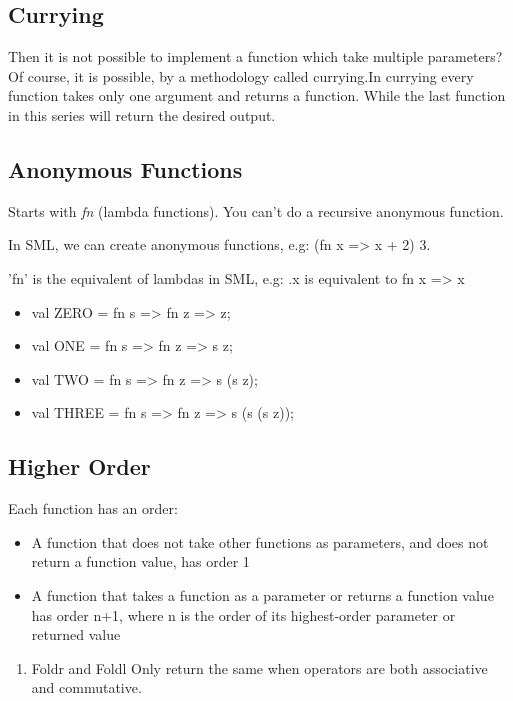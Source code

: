 \documentclass[11pt]{article}
\begin{document}
\subsection{Currying}
\label{sec:org852bf65}
Then it is not possible to implement a function which take multiple parameters? Of
course, it is possible, by a methodology called currying.In currying every function
takes only one argument and returns a function. While the last function in this series
will return the desired output.

\subsection{Anonymous Functions}
\label{sec:org5cdabe9}
Starts with \emph{fn} (lambda functions). You can't do a recursive anonymous function.

In SML, we can create anonymous functions, e.g: (fn x => x + 2) 3.

'fn' is the equivalent of lambdas in SML, e.g:
\x.x is equivalent to fn x => x

\begin{itemize}
\item val ZERO = fn s => fn z => z;
\item val ONE = fn s => fn z => s z;
\item val TWO = fn s => fn z => s (s z);
\item val THREE = fn s => fn z => s (s (s z));
\end{itemize}

\subsection{Higher Order}
\label{sec:org8a3e2ec}
Each function has an order:
\begin{itemize}
\item A function that does not take other functions as parameters, and does not return a
function value, has order 1
\item A function that takes a function as a parameter or returns a function value has order
n+1, where n is the order of its highest-order parameter or returned value
\end{itemize}
\begin{enumerate}
\item Foldr and Foldl
\label{sec:orge0fdabb}
Only return the same when operators are both associative and commutative.
\end{enumerate}
\end{document}
